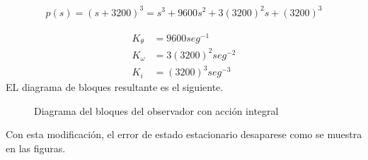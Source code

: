 \documentclass[a4paper, 10pt, onecolumn,journal]{ieeeconf}
\begin{document}
\begin{align}
	p(s) = \left( s + 3200\right) ^3 = s^3 + 9600 s^2 + 3(3200)^2 s + (3200)^3\label{polinomeo caracteristico de observador nuevo deseado}
\end{align}

\begin{align}
	K_{\theta} &= 9600 seg^{-1} \label{ganacia de posicion de observador nuevo}\\
	K_{\omega} &= 3(3200)^2 seg^{-2} \label{ganacia de velocidad de observador nuevo}\\
	K_{i} &= (3200)^3 seg^{-3} \label{ganacia integral de observador nuevo}
\end{align}
EL diagrama de bloques resultante es el siguiente.
\begin{figure}[H]
	\centering
	\begin{adjustbox}{max width=\columnwidth}
	\end{adjustbox}
	\caption{Diagrama del bloques del observador con acción integral}
	\label{Diagrama del bloques del observador con acción integrale}
\end{figure}
Con esta modificación, el error de estado estacionario desaparese como se muestra en las figuras.
\end{document}
